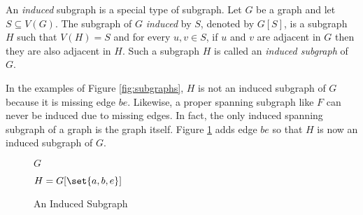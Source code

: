 An \emph{induced} subgraph is a special type of subgraph.  Let \(G\) be a graph and let \(S\subseteq V(G)\).  The
subgraph of \(G\) \emph{induced} by \(S\), denoted by \(G[S]\), is a subgraph \(H\) such that \(V(H)=S\) and for
every \(u,v\in S\), if \(u\) and \(v\) are adjacent in \(G\) then they are also adjacent in \(H\).  Such a subgraph
\(H\) is called an \emph{induced subgraph} of \(G\).

In the examples of Figure \ref{fig:subgraphs}, \(H\) is not an induced subgraph of \(G\) because it is missing edge
\(be\).  Likewise, a proper spanning subgraph like \(F\) can never be induced due to missing edges.  In fact, the
only induced spanning subgraph of a graph is the graph itself.  Figure \ref{fig:induced} adds edge \(be\) so that
\(H\) is now an induced subgraph of \(G\).

\begin{figure}[h]
  \label{fig:induced}
  \begin{minipage}{3in}
    \begin{center}

      \bigskip

      \(G\)
    \end{center}
  \end{minipage}
  \begin{minipage}{3in}
    \begin{center}

      \bigskip

      \(H=G[\set{a,b,e}]\)
    \end{center}
  \end{minipage}
  \caption{An Induced Subgraph}
\end{figure}

